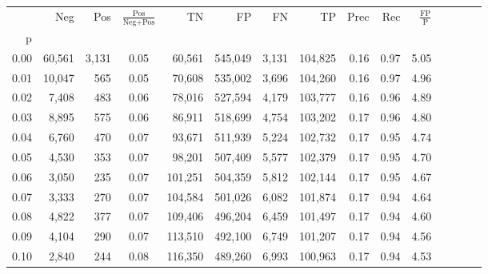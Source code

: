 \begin{tabular}{rrrcrrrrrrrrrrr}
\toprule
{} &     Neg &     Pos & $\frac{\text{Pos}}{\text{Neg}+\text{Pos}}$ &       TN &       FP &       FN &       TP &  Prec &   Rec & $\frac{\text{FP}}{\text{P}}$ \\
p    &         &         &                                            &          &          &          &          &       &       &                              \\
\midrule
0.00 &  60,561 &   3,131 &                                       0.05 &   60,561 &  545,049 &    3,131 &  104,825 &  0.16 &  0.97 &                         5.05 \\
0.01 &  10,047 &     565 &                                       0.05 &   70,608 &  535,002 &    3,696 &  104,260 &  0.16 &  0.97 &                         4.96 \\
0.02 &   7,408 &     483 &                                       0.06 &   78,016 &  527,594 &    4,179 &  103,777 &  0.16 &  0.96 &                         4.89 \\
0.03 &   8,895 &     575 &                                       0.06 &   86,911 &  518,699 &    4,754 &  103,202 &  0.17 &  0.96 &                         4.80 \\
0.04 &   6,760 &     470 &                                       0.07 &   93,671 &  511,939 &    5,224 &  102,732 &  0.17 &  0.95 &                         4.74 \\
0.05 &   4,530 &     353 &                                       0.07 &   98,201 &  507,409 &    5,577 &  102,379 &  0.17 &  0.95 &                         4.70 \\
0.06 &   3,050 &     235 &                                       0.07 &  101,251 &  504,359 &    5,812 &  102,144 &  0.17 &  0.95 &                         4.67 \\
0.07 &   3,333 &     270 &                                       0.07 &  104,584 &  501,026 &    6,082 &  101,874 &  0.17 &  0.94 &                         4.64 \\
0.08 &   4,822 &     377 &                                       0.07 &  109,406 &  496,204 &    6,459 &  101,497 &  0.17 &  0.94 &                         4.60 \\
0.09 &   4,104 &     290 &                                       0.07 &  113,510 &  492,100 &    6,749 &  101,207 &  0.17 &  0.94 &                         4.56 \\
0.10 &   2,840 &     244 &                                       0.08 &  116,350 &  489,260 &    6,993 &  100,963 &  0.17 &  0.94 &                         4.53 \\

\end{tabular}
